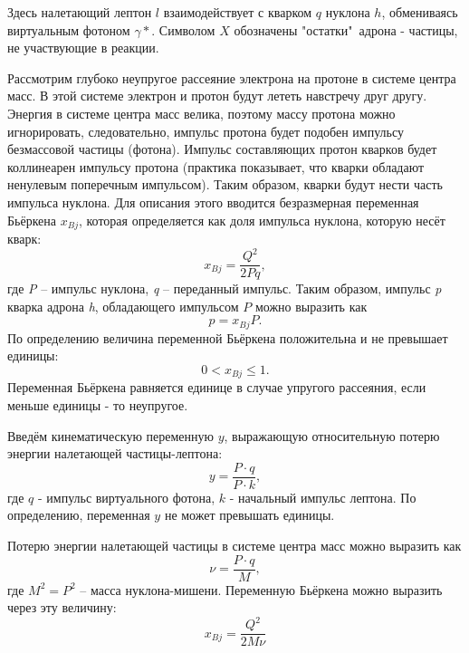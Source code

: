 \documentclass{extarticle}
\begin{document}
Здесь налетающий лептон $l$ взаимодействует с кварком $q$ нуклона $h$, обмениваясь виртуальным фотоном $\gamma*$. Символом $X$ обозначены "остатки"\  адрона - частицы, не участвующие в реакции.

Рассмотрим глубоко неупругое рассеяние электрона на протоне в системе центра масс. В этой системе электрон и протон будут лететь навстречу друг другу. Энергия в системе центра масс велика, поэтому массу протона можно игнорировать, следовательно, импульс протона будет подобен импульсу безмассовой частицы (фотона). Импульс составляющих протон кварков будет коллинеарен импульсу протона (практика показывает, что кварки обладают ненулевым поперечным импульсом). Таким образом, кварки будут нести часть импульса нуклона. Для описания этого вводится безразмерная переменная Бьёркена $x_{Bj}$, которая определяется как доля импульса нуклона, которую несёт кварк:
\begin{equation}
    x_{Bj}= \frac{Q^2}{2Pq},
\end{equation}
где \textit{P} -- импульс нуклона, \textit{q} -- переданный импульс. 
Таким образом, импульс \textit{p} кварка адрона \textit{h}, обладающего импульсом $P$ можно выразить как
\begin{equation}
    p=x_{Bj}P.
\end{equation}
По определению величина переменной Бьёркена положительна и не превышает единицы: 
\begin{equation}
    0 < x_{Bj} \leq 1.
\end{equation}
Переменная Бьёркена равняется единице в случае упругого рассеяния, если меньше единицы - то неупругое.

Введём кинематическую переменную $y$, выражающую относительную потерю энергии налетающей частицы-лептона:
\begin{equation}
    y = \frac{P \cdot q}{P \cdot k},
\end{equation}
где $q$ - импульс виртуального фотона, $k$ - начальный импульс лептона. По определению, переменная $y$ не может превышать единицы.

Потерю энергии налетающей частицы в системе центра масс можно выразить как 
\begin{equation}
    \nu = \frac{P \cdot q}{M},
\end{equation}
где $M^2 = P^2$ -- масса нуклона-мишени. Переменную Бьёркена можно выразить через эту величину:
\begin{equation}
    x_{Bj} = \frac{Q^2}{2M\nu}
\end{equation}
\end{document}
